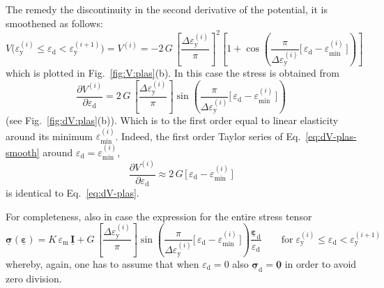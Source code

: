 \documentclass[times,namecite]{goose-article}
\newcommand\T[1]{\underline{\bm{{#1}}}}
\begin{document}
The remedy the discontinuity in the second derivative of the potential, it is smoothened as follows:
\begin{equation}\label{eq:V-plas-smooth}
  V \big(
    \varepsilon_\mathrm{y}^{(i)} \leq \varepsilon_\mathrm{d} < \varepsilon_\mathrm{y}^{(i+1)}
  \big)
  =
  V^{(i)}
  =
  - 2 \, G \,
  \left[ \frac{\Delta \varepsilon_\mathrm{y}^{(i)}}{\pi} \right]^2
  \left[
    1
    +
    \cos \left(
      \frac{ \pi }{ \Delta \varepsilon_\mathrm{y}^{(i)} }
      \Big[\, \varepsilon_\mathrm{d} - \varepsilon_\mathrm{min}^{(i)} \,\Big]
    \right)
  \right]
\end{equation}
which is plotted in Fig.~\ref{fig:V:plas}(b). In this case the stress is obtained from
\begin{equation}\label{eq:dV-plas-smooth}
  \frac{\partial V^{(i)}}{\partial \varepsilon_\mathrm{d}}
  =
  2 \, G \,
  \left[ \frac{\Delta \varepsilon_\mathrm{y}^{(i)}}{\pi} \right]
  \sin \left(
    \frac{ \pi }{ \Delta \varepsilon_\mathrm{y}^{(i)} }
    \Big[\, \varepsilon_\mathrm{d} - \varepsilon_\mathrm{min}^{(i)} \,\Big]
  \right)
\end{equation}
(see Fig.~\ref{fig:dV:plas}(b)). Which is to the first order equal to linear elasticity around its minimum $\varepsilon_\mathrm{min}^{(i)}$. Indeed, the first order Taylor series of Eq.~\eqref{eq:dV-plas-smooth} around $\varepsilon_\mathrm{d} = \varepsilon_\mathrm{min}^{(i)}$,
\begin{equation}
  \frac{\partial V^{(i)}}{\partial \varepsilon_\mathrm{d}}
  \approx
  2 \, G \, \Big[\, \varepsilon_\mathrm{d} - \varepsilon_\mathrm{min}^{(i)} \,\Big]
\end{equation}
is identical to Eq.~\eqref{eq:dV-plas}.

For completeness, also in case the expression for the entire stress tensor
\begin{equation}
  \T{\sigma} ( \T{\varepsilon} )
  =
  K \, \varepsilon_\mathrm{m} \, \T{I}
  +
  G \,
  \left[ \frac{\Delta \varepsilon_\mathrm{y}^{(i)}}{\pi} \right]
  \sin \left(
    \frac{ \pi }{ \Delta \varepsilon_\mathrm{y}^{(i)} }
    \Big[\, \varepsilon_\mathrm{d} - \varepsilon_\mathrm{min}^{(i)} \,\Big]
  \right)
  \frac{\T{\varepsilon}_\mathrm{d}}{\varepsilon_\mathrm{d}}
  \qquad
  \mathrm{for}
  \;
  \varepsilon_\mathrm{y}^{(i)} \leq \varepsilon_\mathrm{d} < \varepsilon_\mathrm{y}^{(i+1)}
\end{equation}
whereby, again, one has to assume that when $\varepsilon_\mathrm{d} = 0$ also $\T{\sigma}_\mathrm{d} = \T{0}$ in order to avoid zero division.
\end{document}
